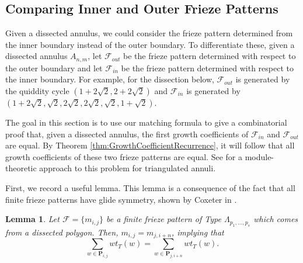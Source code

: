 \documentclass[12pt]{article}
\newtheorem{lemma}{Lemma}
\theoremstyle{remark}
\newcommand*{\pathset}[2]{\mathbf{P}_{#1,#2}}
\begin{document}
\subsection{Comparing Inner and Outer Frieze Patterns}\label{subsec:InAndOutFP}

Given a dissected annulus, we could consider the frieze pattern determined from the inner boundary instead of the outer boundary. To differentiate these, given a dissected annulus $A_{n,m}$, let $\mathcal{F}_{out}$ be the frieze pattern determined with respect to the outer boundary and let $\mathcal{F}_{in}$ be the frieze pattern determined with respect to the inner boundary. For example, for the dissection below, $\mathcal{F}_{out}$ is generated by the quiddity cycle $(1+2\sqrt{2},2 + 2\sqrt{2})$ and $\mathcal{F}_{in}$ is generated by $(1+2\sqrt{2}, \sqrt{2},2\sqrt{2},2\sqrt{2},\sqrt{2},1+\sqrt{2})$.

\begin{center}
\end{center}

The goal in this section is to use our matching formula to give a combinatorial proof that, given a dissected annulus, the first growth coefficients of $\mathcal{F}_{in}$ and $\mathcal{F}_{out}$ are equal. By Theorem \ref{thm:GrowthCoefficientRecurrence}, it will follow that all growth coefficients of these two frieze patterns are equal. See \cite{3} for a module-theoretic approach to this problem for triangulated annuli. 

First, we record a useful lemma. This lemma is a consequence of the fact that all finite frieze patterns have glide symmetry, shown by Coxeter in \cite{11}. 

\begin{lemma}\label{lem:EitherDirection}
Let $\mathcal{F} = \{m_{i,j}\}$ be a finite frieze pattern of Type $\Lambda_{p_1,\ldots,p_s}$ which comes from a dissected polygon. Then, $m_{i,j} = m_{j,i+n}$, implying that \[
\sum_{w \in \pathset{i}{j}} wt_T(w) = \sum_{w \in \pathset{j}{i+n}} wt_T(w).
\]
\end{lemma}
\end{document}

